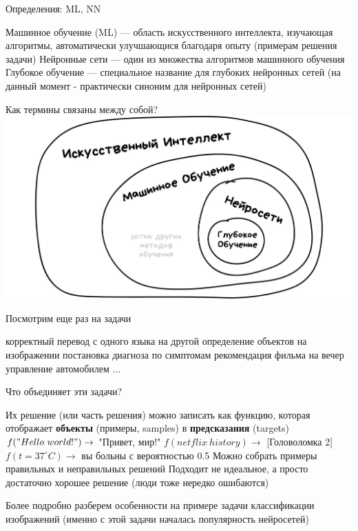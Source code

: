 \documentclass[aspectratio=169, professionalfonts]{beamer}
\begin{document}
\begin{frame}{Определения: ML, NN}
    \begin{outline}
        \1 Машинное обучение (ML) --- область искусственного интеллекта, изучающая алгоритмы,
        автоматически улучшающися благодаря опыту (примерам решения задачи)
        \1 Нейронные сети --- один из множества алгоритмов машинного обучения
        \1 Глубокое обучение --- специальное название для глубоких нейронных сетей (на данный момент - практически синоним для нейронных сетей)
    \end{outline}
\end{frame}

\begin{frame}{Как термины связаны между собой?}
    \centering
    \includegraphics[width=.9\linewidth]{figures/fig6-terms.jpg}
\end{frame}

\begin{frame}{Посмотрим еще раз на задачи}
    \begin{outline}
        \1 корректный перевод с одного языка на другой
        \1 определение объектов на изображении
        \1 постановка диагноза по симптомам
        \1 рекомендация фильма на вечер
        \1 управление автомобилем
        \1 ...
    \end{outline}
\end{frame}

\begin{frame}{Что объединяет эти задачи?}
    \begin{outline}
        \1 Их решение (или часть решения) можно записать как функцию, которая отображает
        \textbf{объекты} (примеры, samples) в \textbf{предсказания} (targets)
            \2 \( f("Hello \ world!") \to \) "Привет, мир!"
            \2 \( f(netflix \ history) \to \) [Головоломка 2]
            \2 \( f(t = 37^\circ C) \to \) вы больны с вероятностью 0.5
        \pause
        \1 Можно собрать примеры правильных и неправильных решений
        \pause
        \1 Подходит не идеальное, а просто достаточно хорошее решение
            (люди тоже нередко ошибаются)
    \end{outline}

    Более подробно разберем особенности на примере задачи классификации изображений (именно с этой задачи началась популярность нейросетей)
\end{frame}
\end{document}
